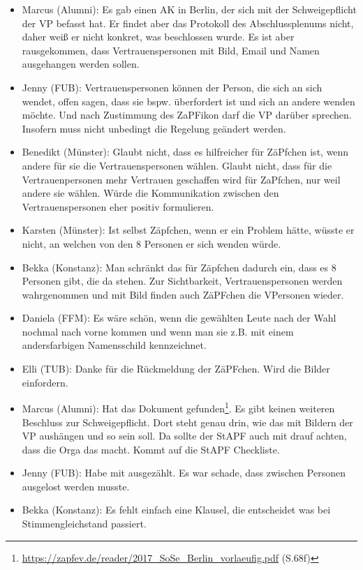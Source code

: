 \begin{itemize}
        \item Marcus (Alumni): Es gab einen AK in Berlin, der sich mit der Schweigepflicht der VP befasst hat. Er findet aber das Protokoll des Abschlussplenums nicht, daher weiß er nicht konkret, was beschlossen wurde. Es ist aber rausgekommen, dass Vertrauenspersonen mit Bild, Email und Namen ausgehangen werden sollen.
        \item Jenny (FUB): Vertrauenspersonen können der Person, die sich an sich wendet, offen sagen, dass sie bspw. überfordert ist und sich an andere wenden möchte. Und nach Zustimmung des ZaPFikon darf die VP darüber sprechen. Insofern muss nicht unbedingt die Regelung geändert werden.
        \item Benedikt (Münster): Glaubt nicht, dass es hilfreicher für ZäPfchen ist, wenn andere für sie die Vertrauenspersonen wählen. Glaubt nicht, dass für die Vertrauenpersonen mehr Vertrauen geschaffen wird für ZaPfchen, nur weil andere sie wählen. Würde die Kommunikation zwischen den Vertrauenspersonen eher positiv formulieren.
        \item Karsten (Münster): Ist selbst Zäpfchen, wenn er ein Problem hätte, wüsste er nicht, an welchen von den 8 Personen er sich wenden würde.
        \item Bekka (Konstanz): Man schränkt das für Zäpfchen dadurch ein, dass es 8 Personen gibt, die da stehen. Zur Sichtbarkeit, Vertrauenspersonen werden wahrgenommen und mit Bild finden auch ZäPFchen die VPersonen wieder.
        \item Daniela (FFM): Es wäre schön, wenn die gewählten Leute nach der Wahl nochmal nach vorne kommen und wenn man sie z.B. mit einem andersfarbigen Namensschild kennzeichnet.
        \item Elli (TUB): Danke für die Rückmeldung der ZäPFchen. Wird die Bilder einfordern.
        \item Marcus (Alumni): Hat das Dokument gefunden\footnote{\url{https://zapfev.de/reader/2017_SoSe_Berlin_vorlaeufig.pdf} (S.68f)}. Es gibt keinen weiteren Beschluss zur Schweigepflicht. Dort steht genau drin, wie das mit Bildern der VP aushängen und so sein soll. Da sollte der StAPF auch mit drauf achten, dass die Orga das macht. Kommt auf die StAPF Checkliste.
        \item Jenny (FUB): Habe mit ausgezählt. Es war schade, dass zwischen Personen ausgelost werden musste.
        \item Bekka (Konstanz): Es fehlt einfach eine Klausel, die entscheidet was bei Stimmengleichstand passiert.

\end{itemize}
